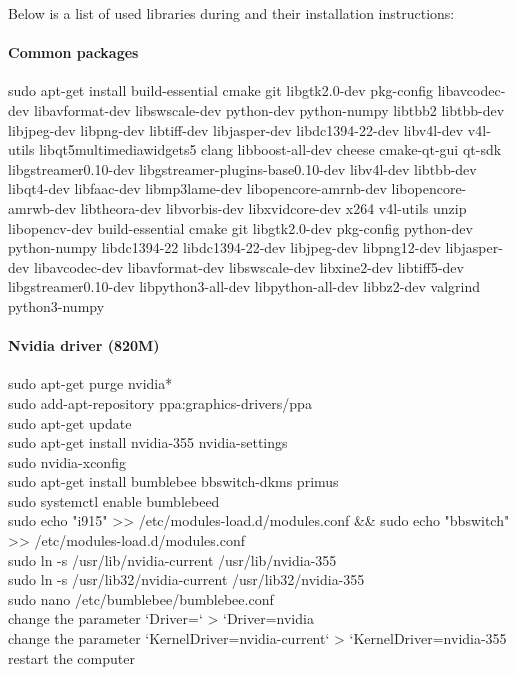 Below is a list of used libraries during and their installation instructions:

\paragraph{Common packages}
\begin{sBox}
	sudo apt-get install build-essential cmake git libgtk2.0-dev pkg-config libavcodec-dev libavformat-dev libswscale-dev python-dev python-numpy libtbb2 libtbb-dev libjpeg-dev libpng-dev libtiff-dev libjasper-dev libdc1394-22-dev libv4l-dev v4l-utils libqt5multimediawidgets5 clang libboost-all-dev cheese cmake-qt-gui qt-sdk libgstreamer0.10-dev libgstreamer-plugins-base0.10-dev libv4l-dev libtbb-dev libqt4-dev libfaac-dev libmp3lame-dev libopencore-amrnb-dev libopencore-amrwb-dev libtheora-dev libvorbis-dev libxvidcore-dev x264 v4l-utils unzip libopencv-dev build-essential cmake git libgtk2.0-dev pkg-config python-dev python-numpy libdc1394-22 libdc1394-22-dev libjpeg-dev libpng12-dev libjasper-dev libavcodec-dev libavformat-dev libswscale-dev libxine2-dev libtiff5-dev libgstreamer0.10-dev libpython3-all-dev libpython-all-dev libbz2-dev valgrind python3-numpy
\end{sBox}

\paragraph{Nvidia driver (820M)}
\begin{sBox}
	sudo apt-get purge nvidia*\\
	sudo add-apt-repository ppa:graphics-drivers/ppa\\
	sudo apt-get update\\
	sudo apt-get install nvidia-355 nvidia-settings\\
	sudo nvidia-xconfig\\
	sudo apt-get install bumblebee bbswitch-dkms primus\\
	sudo systemctl enable bumblebeed\\
	sudo echo "i915" >> /etc/modules-load.d/modules.conf \&\& sudo echo "bbswitch" >> /etc/modules-load.d/modules.conf\\  
	sudo ln -s /usr/lib/nvidia-current /usr/lib/nvidia-355\\
	sudo ln -s /usr/lib32/nvidia-current /usr/lib32/nvidia-355\\
	sudo nano /etc/bumblebee/bumblebee.conf\\
	change the parameter `Driver=` > `Driver=nvidia\\
	change the parameter `KernelDriver=nvidia-current` > `KernelDriver=nvidia-355\\
	restart the computer\\
\end{sBox}


